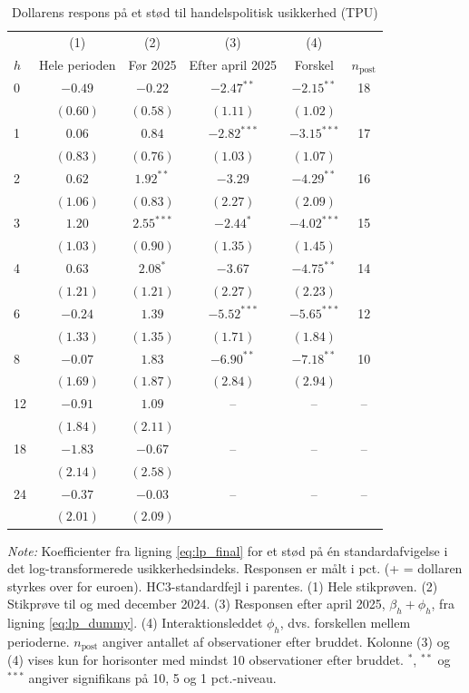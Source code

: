 \begin{table}[H]
\centering
\caption{Dollarens respons på et stød til handelspolitisk usikkerhed (TPU)}
\label{tab:lp_tpu}
\begin{threeparttable}
\begin{tabular}{l cccc c}
\toprule
 & (1) & (2) & (3) & (4) & \\
$h$ & Hele perioden & Før 2025 & Efter april 2025 & Forskel & $n_{\text{post}}$ \\
\midrule
0 & $-0.49$ & $-0.22$ & $-2.47^{**}$ & $-2.15^{**}$ & 18 \\
 & $(0.60)$ & $(0.58)$ & $(1.11)$ & $(1.02)$ & \\[2pt]
1 & $0.06$ & $0.84$ & $-2.82^{***}$ & $-3.15^{***}$ & 17 \\
 & $(0.83)$ & $(0.76)$ & $(1.03)$ & $(1.07)$ & \\[2pt]
2 & $0.62$ & $1.92^{**}$ & $-3.29$ & $-4.29^{**}$ & 16 \\
 & $(1.06)$ & $(0.83)$ & $(2.27)$ & $(2.09)$ & \\[2pt]
3 & $1.20$ & $2.55^{***}$ & $-2.44^{*}$ & $-4.02^{***}$ & 15 \\
 & $(1.03)$ & $(0.90)$ & $(1.35)$ & $(1.45)$ & \\[2pt]
4 & $0.63$ & $2.08^{*}$ & $-3.67$ & $-4.75^{**}$ & 14 \\
 & $(1.21)$ & $(1.21)$ & $(2.27)$ & $(2.23)$ & \\[2pt]
6 & $-0.24$ & $1.39$ & $-5.52^{***}$ & $-5.65^{***}$ & 12 \\
 & $(1.33)$ & $(1.35)$ & $(1.71)$ & $(1.84)$ & \\[2pt]
8 & $-0.07$ & $1.83$ & $-6.90^{**}$ & $-7.18^{**}$ & 10 \\
 & $(1.69)$ & $(1.87)$ & $(2.84)$ & $(2.94)$ & \\[2pt]
12 & $-0.91$ & $1.09$ & – & – & – \\
 & $(1.84)$ & $(2.11)$ &  &  & \\[2pt]
18 & $-1.83$ & $-0.67$ & – & – & – \\
 & $(2.14)$ & $(2.58)$ &  &  & \\[2pt]
24 & $-0.37$ & $-0.03$ & – & – & – \\
 & $(2.01)$ & $(2.09)$ &  &  & \\[2pt]
\bottomrule
\end{tabular}
\begin{tablenotes}[flushleft]\footnotesize
\item \textit{Note:} Koefficienter fra ligning \eqref{eq:lp_final} for et stød på én standardafvigelse i det log-transformerede usikkerhedsindeks. Responsen er målt i pct. (+ = dollaren styrkes over for euroen). HC3-standardfejl i parentes. (1) Hele stikprøven. (2) Stikprøve til og med december 2024. (3) Responsen efter april 2025, $\beta_h+\phi_h$, fra ligning \eqref{eq:lp_dummy}. (4) Interaktionsleddet $\phi_h$, dvs. forskellen mellem perioderne. $n_{\text{post}}$ angiver antallet af observationer efter bruddet. Kolonne (3) og (4) vises kun for horisonter med mindst 10 observationer efter bruddet. $^{*}$, $^{**}$ og $^{***}$ angiver signifikans på 10, 5 og 1 pct.-niveau.
\end{tablenotes}
\end{threeparttable}
\end{table}